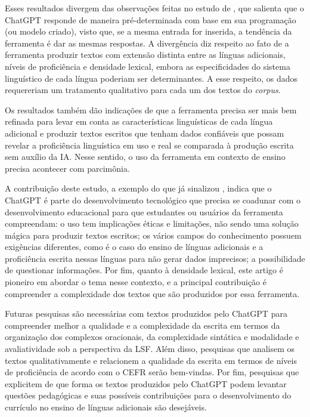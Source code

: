 \documentclass[portuguese]{textolivre}
\begin{document}
Esses resultados divergem das observações feitas no estudo de \textcite{lancaster_artificial_2023}, que salienta que o ChatGPT responde de maneira pré-determinada com base em sua programação (ou modelo criado), visto que, se a mesma entrada for inserida, a tendência da ferramenta é dar as mesmas respostas. A divergência diz respeito ao fato de a ferramenta produzir textos com extensão distinta entre as línguas adicionais, níveis de proficiência e densidade lexical, embora as especificidades do sistema linguístico de cada língua poderiam ser determinantes. A esse respeito, os dados requereriam um tratamento qualitativo para cada um dos textos do \textit{corpus}. 

Os resultados também dão indicações de que a ferramenta precisa ser mais bem refinada para levar em conta as características linguísticas de cada língua adicional e produzir textos escritos que tenham dados confiáveis que possam revelar a proficiência linguística em uso e real se comparada à produção escrita sem auxílio da IA. Nesse sentido, o uso da ferramenta em contexto de ensino precisa acontecer com parcimônia. 

A contribuição deste estudo, a exemplo do que já sinalizou \textcite{lancaster_artificial_2023}, indica que o ChatGPT é parte do desenvolvimento tecnológico que precisa se coadunar com o desenvolvimento educacional para que estudantes ou usuários da ferramenta compreendam: o uso tem implicações éticas e limitações, não sendo uma solução mágica para produzir textos escritos; os vários campos do conhecimento possuem exigências diferentes, como é o caso do ensino de línguas adicionais e a proficiência escrita nessas línguas para não gerar dados imprecisos; a possibilidade de questionar informações. Por fim, quanto à densidade lexical, este artigo é pioneiro em abordar o tema nesse contexto, e a principal contribuição é compreender a complexidade dos textos que são produzidos por essa ferramenta. 

Futuras pesquisas são necessárias com textos produzidos pelo ChatGPT para compreender melhor a qualidade e a complexidade da escrita em termos da organização dos complexos oracionais, da complexidade sintática e modalidade e avaliatividade sob a perspectiva da LSF. Além disso, pesquisas que analisem os textos qualitativamente e relacionem a qualidade da escrita em termos de níveis de proficiência de acordo com o CEFR serão bem-vindas. Por fim, pesquisas que explicitem de que forma os textos produzidos pelo ChatGPT podem levantar questões pedagógicas e suas possíveis contribuições para o desenvolvimento do currículo no ensino de línguas adicionais são desejáveis. 
\end{document}
